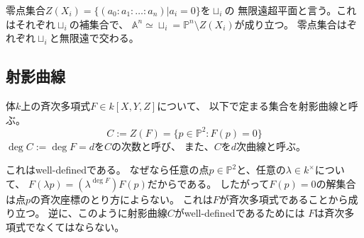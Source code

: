 \documentclass[a4]{article}
\newcommand{\affine}{\mathbb{A}}
\newcommand{\proj}{\mathbb{P}}
\begin{document}
        零点集合$Z(X_i)=\{(a_0: a_1: \dots: a_n) | a_i=0\}$を$\sqcup_i$の
        無限遠超平面と言う。これはそれぞれ$\sqcup_i$の補集合で、
        $\affine^n \simeq \sqcup_i = \proj^n \setminus Z(X_i)$が成り立つ。
        零点集合はぞれぞれ$\sqcup_i$と無限遠で交わる。

        \subsection{射影曲線}
        \begin{Def}[射影曲線]
            体$k$上の斉次多項式$F \in k[X, Y,Z]$について、
            以下で定まる集合を射影曲線と呼ぶ。
            \[ C:=Z(F)=\{p \in \proj^2 : F(p)=0 \}\]
            $\deg C:=\deg F=d$を$C$の次数と呼び、
            また、$C$を$d$次曲線と呼ぶ。
        \end{Def}

        これはwell-definedである。
        なぜなら任意の点$p \in \proj^2$と、任意の$\lambda \in k^{\times}$について、
        $F(\lambda p)=(\lambda^{\deg F}) F(p)$だからである。
        したがって$F(p)=0$の解集合は点$p$の斉次座標のとり方によらない。
        これは$F$が斉次多項式であることから成り立つ。
        逆に、このように射影曲線$C$がwell-definedであるためには
        $F$は斉次多項式でなくてはならない。
\end{document}
